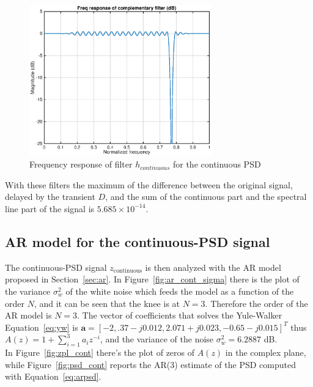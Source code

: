 \documentclass[10pt]{article}
\numberwithin{equation}{section}
\begin{document}
\begin{figure}[h!]
  \centering
  \includegraphics[width = 0.7\textwidth]{images/filter_continuous}
  \caption{Frequency response of filter $h_{continuous}$ for the continuous PSD}
  \label{fig:cont_filt}
\end{figure}

With these filters the maximum of the difference between the original signal, delayed by the transient $D$, and the sum of the continuous part and the spectral line part of the signal is $5.685 \times 10^{-14}$. \\

\subsection*{AR model for the continuous-PSD signal}
The continuous-PSD signal $z_{\text{continuous}}$ is then analyzed with the AR model proposed in Section~\ref{sec:ar}. In Figure~\ref{fig:ar_cont_sigma} there is the plot of the variance $\sigma_w^2$ of the white noise which feeds the model as a function of the order $N$, and it can be seen that the knee is at $N=3$. %
Therefore the order of the AR model is $N=3$. The vector of coefficients that solves the Yule-Walker Equation~\ref{eq:yw} is $\mathbf{a} = [-2,
.37 - j0.012, 2.071 + j0.023, -0.65 - j0.015]^T$ thus $A(z) = 1 + \sum_{i=1}^3a_i z^{-i}$, and the variance of the noise $\sigma_w^2 = 6.2887$ dB. \\ %
In Figure~\ref{fig:zpl_cont} there's the plot of zeros of $A(z)$ in the complex plane, while Figure~\ref{fig:psd_cont} reports the AR(3) estimate of the PSD computed with Equation~\ref{eq:arpsd}.
\end{document}
